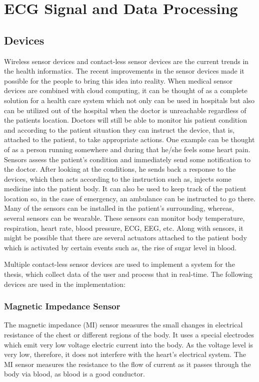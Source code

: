 \chapter{ECG Signal and Data Processing}


\section{Devices}

Wireless sensor devices and contact-less sensor devices are the current trends in the health informatics. The recent improvements in the sensor devices made it possible for the people to bring this idea
into reality. When  medical sensor devices are combined with cloud computing, it can be thought of as a complete
solution for a health care system which not only can be used
in hospitals but also can be utilized out of the hospital when
the doctor is unreachable regardless of the patients location.
Doctors will still be able to monitor his patient condition and
according to the patient situation they can instruct the device,
that is, attached to the patient, to take appropriate actions.
One example can be thought of as a person running somewhere and during that he/she feels some heart pain. Sensors assess the patient's condition and immediately send some notification to the doctor. After looking at the conditions, he sends back a response to the devices, which then acts according to the instruction such as, injects some medicine into the patient body. It can also be used to keep track of the patient location so, in the case of emergency, an ambulance can be instructed to go there.
Many of the sensors can be installed in the patient's surrounding, whereas,
several sensors can be wearable. These sensors can monitor
body temperature, respiration, heart rate, blood pressure, ECG, EEG, etc.
Along with sensors, it might be possible that there are several
actuators attached to the patient body which is activated by
certain events such as, the rise of sugar level in blood.

Multiple contact-less sensor devices are used to implement a system for the thesis, which collect data of the user and process that in real-time. The following devices are used in the implementation:

\subsection{Magnetic Impedance Sensor}

The magnetic impedance (MI) sensor measures the small changes in electrical resistance of the chest or different regions of the body. It uses a special electrodes which emit very low voltage electric current into the body. As the voltage level is very low, therefore, it does not interfere with the heart's electrical system. The MI sensor measures the resistance to the flow of current as it passes through the body via blood, as blood is a good conductor.

